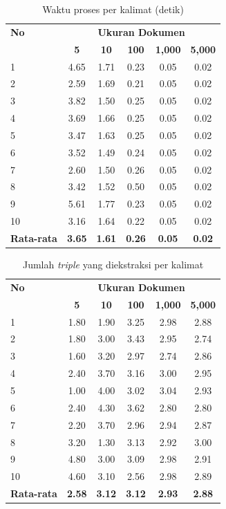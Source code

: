 \begin{table}
	\caption{Waktu proses per kalimat (detik)}
	\label{tab:system_extraction_time}
	\centering
	\begin{tabular}{l *{5}{c}}
		\hline
		\textbf{No} & \multicolumn{5}{c}{\textbf{Ukuran Dokumen}} \\
		\cline{2-6}
		& \textbf{5} & \textbf{10} & \textbf{100} & \textbf{1,000} & \textbf{5,000} \\
		\hline			
		1 & 4.65 & 1.71 & 0.23 & 0.05 & 0.02 \\
		2 & 2.59 & 1.69 & 0.21 & 0.05 & 0.02 \\
		3 & 3.82 & 1.50 & 0.25 & 0.05 & 0.02 \\
		4 & 3.69 & 1.66 & 0.25 & 0.05 & 0.02 \\
		5 & 3.47 & 1.63 & 0.25 & 0.05 & 0.02 \\
		6 & 3.52 & 1.49 & 0.24 & 0.05 & 0.02 \\
		7 & 2.60 & 1.50 & 0.26 & 0.05 & 0.02 \\
		8 & 3.42 & 1.52 & 0.50 & 0.05 & 0.02 \\
		9 & 5.61 & 1.77 & 0.23 & 0.05 & 0.02 \\
		10 & 3.16 & 1.64 & 0.22 & 0.05 & 0.02 \\
		\hline
		\textbf{Rata-rata} & \textbf{3.65} & \textbf{1.61} & \textbf{0.26} & \textbf{0.05} & \textbf{0.02} \\
		\hline
	\end{tabular}
\end{table}

\begin{table}
	\caption{Jumlah \textit{triple} yang diekstraksi per kalimat}
	\label{tab:system_extraction_triple}
	\centering
	\begin{tabular}{l *{5}{c}}
		\hline
		\textbf{No} & \multicolumn{5}{c}{\textbf{Ukuran Dokumen}} \\
		\cline{2-6}
		& \textbf{5} & \textbf{10} & \textbf{100} & \textbf{1,000} & \textbf{5,000} \\
		\hline			
		1 & 1.80 & 1.90 & 3.25 & 2.98 & 2.88 \\
		2 & 1.80 & 3.00 & 3.43 & 2.95 & 2.74 \\
		3 & 1.60 & 3.20 & 2.97 & 2.74 & 2.86 \\
		4 & 2.40 & 3.70 & 3.16 & 3.00 & 2.95 \\
		5 & 1.00 & 4.00 & 3.02 & 3.04 & 2.93 \\
		6 & 2.40 & 4.30 & 3.62 & 2.80 & 2.80 \\
		7 & 2.20 & 3.70 & 2.96 & 2.94 & 2.87 \\
		8 & 3.20 & 1.30 & 3.13 & 2.92 & 3.00 \\
		9 & 4.80 & 3.00 & 3.09 & 2.98 & 2.91 \\
		10 & 4.60 & 3.10 & 2.56 & 2.98 & 2.89 \\
		\hline
		\textbf{Rata-rata} & \textbf{2.58} & \textbf{3.12} & \textbf{3.12} & \textbf{2.93} & \textbf{2.88} \\
		\hline
	\end{tabular}
\end{table}


